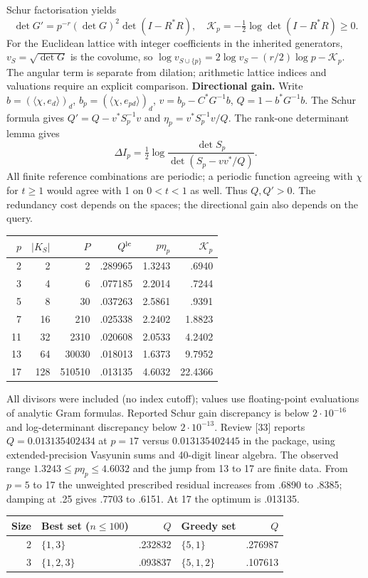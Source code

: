 \documentclass[11pt,a4paper]{article}
\newenvironment{tabla}{\par\smallskip\small}{\par\smallskip}
\begin{document}
Schur factorisation yields
\[\det G'=p^{-r}(\det G)^2\det(I-R^*R),\quad \mathcal K_p=-\tfrac12\log\det(I-R^*R)\ge0.\tag{4.7}\]
For the Euclidean lattice with integer coefficients in the inherited generators, $v_S=\sqrt{\det G}$ is the covolume, so $\log v_{S\cup\{p\}}=2\log v_S-(r/2)\log p-\mathcal K_p$. The angular term is separate from dilation; arithmetic lattice indices and valuations require an explicit comparison.
\textbf{Directional gain.} Write $b=(\langle\chi,e_d\rangle)_d$, $b_p=(\langle\chi,e_{pd}\rangle)_d$, $v=b_p-C^*G^{-1}b$, $Q=1-b^*G^{-1}b$. The Schur formula gives $Q'=Q-v^*S_p^{-1}v$ and $\eta_p=v^*S_p^{-1}v/Q$. The rank-one determinant lemma gives
\[\Delta I_p=\tfrac12\log\frac{\det S_p}{\det(S_p-vv^*/Q)}.\tag{4.8}\]
All finite reference combinations are periodic; a periodic function agreeing with $\chi$ for $t\ge1$ would agree with 1 on $0<t<1$ as well. Thus $Q,Q'>0$. The redundancy cost depends on the spaces; the directional gain also depends on the query.
\begin{tabla}\centering\begin{tabular}{@{}rrrrrr@{}}\toprule
$p$&$|K_S|$&$P$&$Q^{\rm lc}$&$p\eta_p$&$\mathcal K_p$\\\midrule
2&2&2&.289965&1.3243&.6940\\3&4&6&.077185&2.2014&.7244\\5&8&30&.037263&2.5861&.9391\\7&16&210&.025338&2.2402&1.8823\\11&32&2310&.020608&2.0533&4.2402\\13&64&30030&.018013&1.6373&9.7952\\17&128&510510&.013135&4.6032&22.4366\\\bottomrule\end{tabular}\end{tabla}
All divisors were included (no index cutoff); values use floating-point evaluations of analytic Gram formulas. Reported Schur gain discrepancy is below $2\cdot10^{-16}$ and log-determinant discrepancy below $2\cdot10^{-13}$. Review [33] reports $Q=0.013135402434$ at $p=17$ versus $0.013135402445$ in the package, using extended-precision Vasyunin sums and 40-digit linear algebra. The observed range $1.3243\le p\eta_p\le4.6032$ and the jump from 13 to 17 are finite data. From $p=5$ to 17 the unweighted prescribed residual increases from .6890 to .8385; damping at .25 gives .7703 to .6151. At 17 the optimum is .013135.
\begin{center}\small\begin{tabular}{@{}rlrlr@{}}\toprule
Size&Best set ($n\le100$)&$Q$&Greedy set&$Q$\\\midrule
2&$\{1,3\}$&.232832&$\{5,1\}$&.276987\\3&$\{1,2,3\}$&.093837&$\{5,1,2\}$&.107613\\\bottomrule\end{tabular}\end{center}
\end{document}
